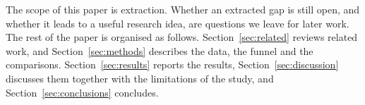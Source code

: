 The scope of this paper is extraction. Whether an extracted gap is still open, and whether it leads to a useful research idea, are questions we leave for later work. The rest of the paper is organised as follows. Section~\ref{sec:related} reviews related work, and Section~\ref{sec:methods} describes the data, the funnel and the comparisons. Section~\ref{sec:results} reports the results, Section~\ref{sec:discussion} discusses them together with the limitations of the study, and Section~\ref{sec:conclusions} concludes.
